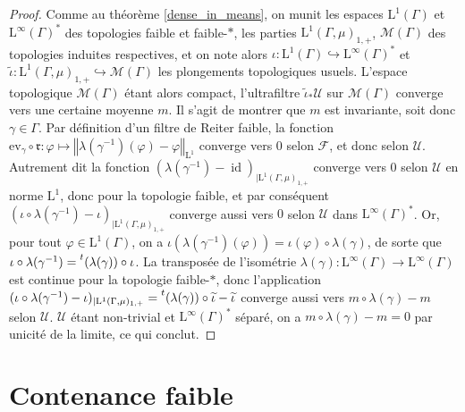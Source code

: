 \documentclass[a4paper,12pt]{article}
\newcommand{\ev}{\mathrm{ev}}
\newcommand{\norm}[1]{\left\Vert #1\right\Vert}
\newcommand{\transpose}[1]{\prescript{t}{}{#1}{}{}}
\newcommand{\inv}{^{-1}}
\newcommand{\comp}{\circ}
\DeclareMathOperator{\id}{id}
\begin{document}
\begin{proof}
    Comme au théorème \ref{dense_in_means}, on munit les espaces $\mathrm{L}^1(\Gamma)$ et $\mathrm{L}^\infty(\Gamma)^*$ des topologies faible et faible-$*$,
    les parties $\mathrm{L}^1(\Gamma, \mu)_{1, +}$, $\mathcal{M}(\Gamma)$ des topologies induites respectives, et on note alors
    $\iota:\mathrm{L}^1(\Gamma)\hookrightarrow\mathrm{L}^\infty(\Gamma)^*$ et $\widetilde{\iota}:\mathrm{L}^1(\Gamma, \mu)_{1, +}\hookrightarrow \mathcal{M}(\Gamma)$
    les plongements topologiques usuels. L'espace topologique $\mathcal{M}(\Gamma)$ étant alors compact,
    l'ultrafiltre $\widetilde{\iota}_*\mathscr{U}$ sur $\mathcal{M}(\Gamma)$ converge vers une certaine moyenne $m$. Il s'agit de montrer que $m$ est invariante,
    soit donc $\gamma\in\Gamma$. Par définition d'un filtre de Reiter faible, la fonction $\ev_\gamma\comp\mathfrak{r}:\varphi\mapsto\norm{\lambda(\gamma\inv)(\varphi)-\varphi}_{\mathrm{L}^1}$
    converge vers $0$ selon $\mathscr{F}$, et donc selon $\mathscr{U}$. Autrement dit la 
    fonction $(\lambda(\gamma\inv)-\id)_{|\mathrm{L}^1(\Gamma, \mu)_{1, +}}$ converge vers $0$ selon $\mathscr{U}$
    en norme $\mathrm{L}^1$, donc pour la topologie faible, et par conséquent $(\iota\comp\lambda(\gamma\inv)-\iota)_{|\mathrm{L}^1(\Gamma, \mu)_{1, +}}$ converge 
    aussi vers $0$ selon $\mathscr{U}$ dans $\mathrm{L}^\infty(\Gamma)^*$. Or, pour tout
    $\varphi\in\mathrm{L}^1(\Gamma)$, on a $\iota(\lambda(\gamma\inv)(\varphi))=\iota(\varphi)\comp\lambda(\gamma)$, de sorte que 
    $\iota\comp\lambda(\gamma\inv) = \transpose{(\lambda(\gamma))}\comp\iota$.
    La transposée de l'isométrie $\lambda(\gamma):\mathrm{L}^\infty(\Gamma)\to\mathrm{L}^\infty(\Gamma)$ est continue 
    pour la topologie faible-$*$, donc l'application $(\iota\comp\lambda(\gamma\inv)-\iota)_{|\mathrm{L}^1(\Gamma, \mu)_{1, +}} = \transpose{(\lambda(\gamma))}\comp\widetilde{\iota} - \widetilde{\iota}$
    converge aussi vers $m\comp\lambda(\gamma)-m$ selon $\mathscr{U}$.
    $\mathscr{U}$ étant non-trivial et $\mathrm{L}^\infty(\Gamma)^*$ séparé, on a $m\comp\lambda(\gamma)-m = 0$ par unicité de la limite, ce qui conclut.
\end{proof}

\section{Contenance faible}
\end{document}
